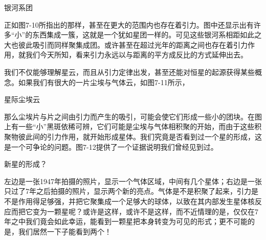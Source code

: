 \documentclass[12pt,oneside]{book}
\begin{document}
\begin{common-format}
\begin{linefig}{银河系团}
\caption{银河系团}
\label{fig:银河系团}
\end{linefig}
正如图7-10所指出的那样，甚至在更大的范围内也存在着引力。图中还显示出有许多“小”的东西集成一簇，这就是一个犹如星团一样的。可见这些银河系相距如此之大也彼此吸引而同样聚集成团。或许甚至在超过光年的距离之间也存在着引力作用，就我们今天所知，看来引力永远以与距离的平方成反比的方式延伸出去。

我们不仅能够理解星云，而且从引力定律出发，甚至还能对恒星的起源获得某些概念。如果我们有很大的一片尘埃与气体云，如图7-11所示，
\begin{linefig}{星际尘埃云}
\caption{星际尘埃云}
\label{fig:星际尘埃云}
\end{linefig}
那么尘埃片与片之间由引力而产生的吸引，可能会使它们形成一些小的团块。在图上有一些“小”黑斑依稀可辨，它们可能是尘埃与气体相积聚的开始，而由于这些积聚物彼此间的引力作用，就开始形成星体。我们究竟是否看到过一个星的形成，这是一个可争论的问题。图7-12提供了一个证据说明我们曾经见到过。
\begin{linefig}{新星的形成？}
\caption{新星的形成？}
\label{fig:新星的形成？}
\end{linefig}
左边是一张1947年拍摄的照片，显示一个气体区域，中间有几个星体；右边是一张只过了7年之后拍摄的照片，显示两个新的亮点。气体是不是积聚了起来，引力是不是作用得足够强，并把它聚集成一个足够大的球体，以致在其内部发生星体核反应而把它变为一颗星呢？或许是这样，或许不是这样，而不近情理的是，仅仅在7年之中我们竟会如此幸运，能看到一颗星把本身转变为可见的形式；更不可能的是，我们居然一下子能看到两个！


\end{common-format}
\end{document}
